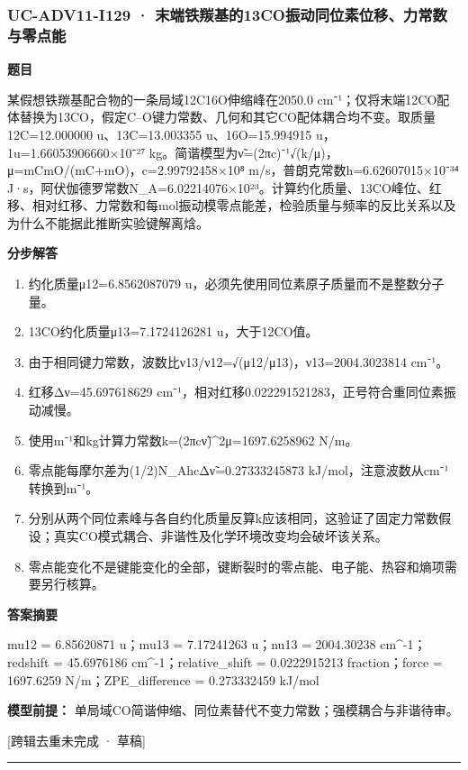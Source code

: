 \documentclass[UTF8,11pt,a4paper]{ctexart}
\begin{document}
\subsubsection*{UC-ADV11-I129 · 末端铁羰基的13CO振动同位素位移、力常数与零点能}
\noindent\textbf{题目}\par
某假想铁羰基配合物的一条局域12C16O伸缩峰在2050.0 cm⁻¹；仅将末端12CO配体替换为13CO，假定C–O键力常数、几何和其它CO配体耦合均不变。取质量12C=12.000000 u、13C=13.003355 u、16O=15.994915 u，1u=1.66053906660×10⁻²⁷ kg。简谐模型为ν̃=(2πc)⁻¹√(k/μ)，μ=mCmO/(mC+mO)，c=2.99792458×10⁸ m/s，普朗克常数h=6.62607015×10⁻³⁴ J·s，阿伏伽德罗常数N\_A=6.02214076×10²³。计算约化质量、13CO峰位、红移、相对红移、力常数和每mol振动模零点能差，检验质量与频率的反比关系以及为什么不能据此推断实验键解离焓。\par
\medskip\noindent\textbf{分步解答}
\begin{enumerate}
\item 约化质量μ12=6.8562087079 u，必须先使用同位素原子质量而不是整数分子量。
\item 13CO约化质量μ13=7.1724126281 u，大于12CO值。
\item 由于相同键力常数，波数比ν13/ν12=√(μ12/μ13)，ν13=2004.3023814 cm⁻¹。
\item 红移Δν=45.697618629 cm⁻¹，相对红移0.022291521283，正号符合重同位素振动减慢。
\item 使用m⁻¹和kg计算力常数k=(2πcν̃)\textasciicircum{}2μ=1697.6258962 N/m。
\item 零点能每摩尔差为(1/2)N\_AhcΔν̃=0.27333245873 kJ/mol，注意波数从cm⁻¹转换到m⁻¹。
\item 分别从两个同位素峰与各自约化质量反算k应该相同，这验证了固定力常数假设；真实CO模式耦合、非谐性及化学环境改变均会破坏该关系。
\item 零点能变化不是键能变化的全部，键断裂时的零点能、电子能、热容和熵项需要另行核算。
\end{enumerate}
\noindent\textbf{答案摘要}\par
mu12 = 6.85620871 u；mu13 = 7.17241263 u；nu13 = 2004.30238 cm\textasciicircum{}-1；redshift = 45.6976186 cm\textasciicircum{}-1；relative\_shift = 0.0222915213 fraction；force = 1697.6259 N/m；ZPE\_difference = 0.273332459 kJ/mol\par
\noindent\textbf{模型前提：}
单局域CO简谐伸缩、同位素替代不变力常数；强模耦合与非谐待审。\par
\noindent\textcolor{red!65!black}{[跨辑去重未完成 · 草稿]} \par
\medskip\hrule\medskip
{}
\end{document}
